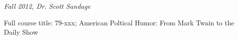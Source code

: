 \textit{Fall 2012, Dr. Scott Sandage}

Full course title: 79-xxx; American Poltical Humor: From Mark Twain to the
Daily Show






